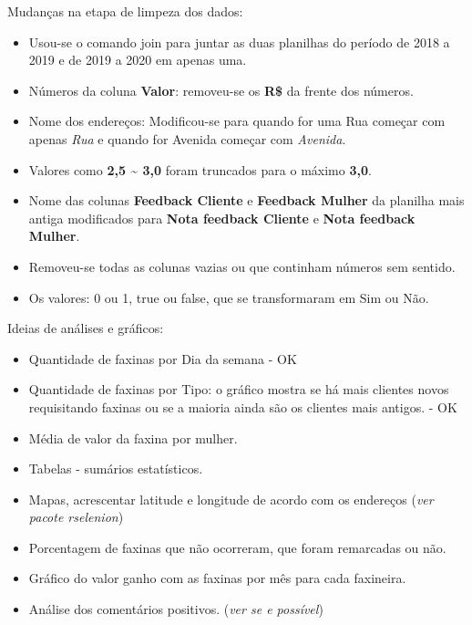 \documentclass[
]{article}
\begin{document}
Mudanças na etapa de limpeza dos dados:

\begin{itemize}
\item
  Usou-se o comando join para juntar as duas planilhas do período de
  2018 a 2019 e de 2019 a 2020 em apenas uma.
\item
  Números da coluna \textbf{Valor}: removeu-se os \textbf{R\$} da frente
  dos números.
\item
  Nome dos endereços: Modificou-se para quando for uma Rua começar com
  apenas \emph{Rua} e quando for Avenida começar com \emph{Avenida}.
\item
  Valores como \textbf{2,5 \textasciitilde{} 3,0} foram truncados para o
  máximo \textbf{3,0}.
\item
  Nome das colunas \textbf{Feedback Cliente} e \textbf{Feedback Mulher}
  da planilha mais antiga modificados para \textbf{Nota feedback
  Cliente} e \textbf{Nota feedback Mulher}.
\item
  Removeu-se todas as colunas vazias ou que continham números sem
  sentido.
\item
  Os valores: 0 ou 1, true ou false, que se transformaram em Sim ou Não.
\end{itemize}

Ideias de análises e gráficos:

\begin{itemize}
\item
  Quantidade de faxinas por Dia da semana - OK
\item
  Quantidade de faxinas por Tipo: o gráfico mostra se há mais clientes
  novos requisitando faxinas ou se a maioria ainda são os clientes mais
  antigos. - OK
\item
  Média de valor da faxina por mulher.
\item
  Tabelas - sumários estatísticos.
\item
  Mapas, acrescentar latitude e longitude de acordo com os endereços
  (\emph{ver pacote rselenion})
\item
  Porcentagem de faxinas que não ocorreram, que foram remarcadas ou não.
\item
  Gráfico do valor ganho com as faxinas por mês para cada faxineira.
\item
  Análise dos comentários positivos. (\emph{ver se e possível})
\end{itemize}
\end{document}
